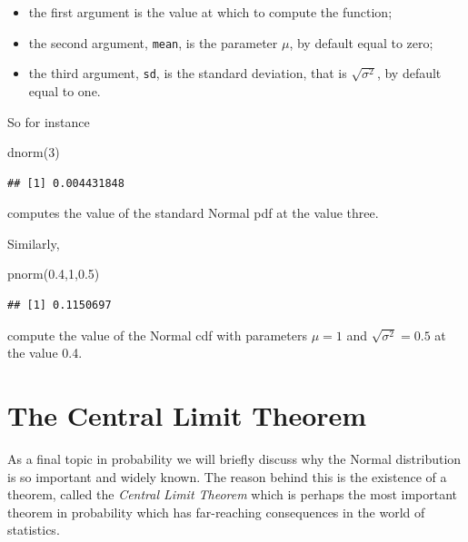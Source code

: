 \documentclass[
]{book}
\newenvironment{Shaded}{\begin{snugshade}}{\end{snugshade}}
\newcommand{\DecValTok}[1]{\textcolor[rgb]{0.00,0.00,0.81}{#1}}
\newcommand{\FloatTok}[1]{\textcolor[rgb]{0.00,0.00,0.81}{#1}}
\newcommand{\FunctionTok}[1]{\textcolor[rgb]{0.00,0.00,0.00}{#1}}
\newcommand{\NormalTok}[1]{#1}
\begin{document}
\begin{itemize}
\item
  the first argument is the value at which to compute the function;
\item
  the second argument, \texttt{mean}, is the parameter \(\mu\), by default equal to zero;
\item
  the third argument, \texttt{sd}, is the standard deviation, that is \(\sqrt{\sigma^2}\), by default equal to one.
\end{itemize}

So for instance

\begin{Shaded}
\begin{Highlighting}[]
\FunctionTok{dnorm}\NormalTok{(}\DecValTok{3}\NormalTok{)}
\end{Highlighting}
\end{Shaded}

\begin{verbatim}
## [1] 0.004431848
\end{verbatim}

computes the value of the standard Normal pdf at the value three.

Similarly,

\begin{Shaded}
\begin{Highlighting}[]
\FunctionTok{pnorm}\NormalTok{(}\FloatTok{0.4}\NormalTok{,}\DecValTok{1}\NormalTok{,}\FloatTok{0.5}\NormalTok{)}
\end{Highlighting}
\end{Shaded}

\begin{verbatim}
## [1] 0.1150697
\end{verbatim}

compute the value of the Normal cdf with parameters \(\mu=1\) and \(\sqrt{\sigma^2}=0.5\) at the value 0.4.

\hypertarget{the-central-limit-theorem}{%
\section{The Central Limit Theorem}\label{the-central-limit-theorem}}

As a final topic in probability we will briefly discuss why the Normal distribution is so important and widely known. The reason behind this is the existence of a theorem, called the \emph{Central Limit Theorem} which is perhaps the most important theorem in probability which has far-reaching consequences in the world of statistics.
\end{document}
